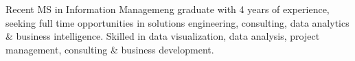 \vspace{-4.5mm}


\begin{cvparagraph}

Recent MS in Information Managemeng graduate with 4 years of experience, seeking full time opportunities in solutions engineering, consulting, data analytics \& business intelligence. Skilled in data visualization, data analysis, project management, consulting \& business development.
\end{cvparagraph}
\vspace{-4.5mm}